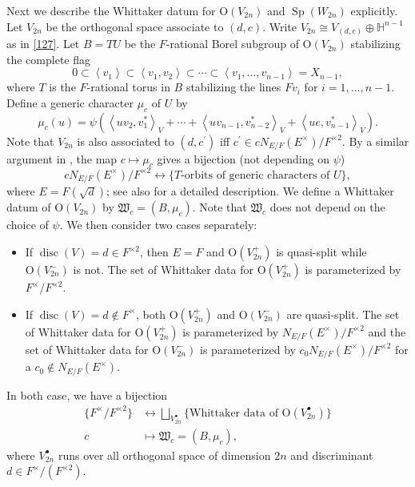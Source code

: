 \documentclass[article]{article}
\numberwithin{equation}{section}
\theoremstyle{definition}
\DeclareMathOperator{\SP}{Sp}
\DeclareMathOperator{\disc}{disc}
\begin{document}
Next we describe the Whittaker datum for $\mathrm O(V_{2n})$ and $\SP(W_{2n})$ explicitly. Let $V_{2n}$ be the orthogonal space associate to $(d,c)$. Write $V_{2n}\cong V_{(d,c)}\oplus \mathbb H^{n-1}$ as in \ref{127}. Let $B=TU$ be the $F$-rational Borel subgroup of $\mathrm O (V_{2n})$ stabilizing the complete flag
$$0 \subset\left\langle v_{1}\right\rangle \subset\left\langle v_{1}, v_{2}\right\rangle \subset \cdots \subset\left\langle v_{1}, \ldots, v_{n-1}\right\rangle= X_{n-1},$$
where $T$ is the $F$-rational torus in $B$ stabilizing the lines $F v_{i}$ for $i=1, \ldots, n-1$. Define a generic character $\mu_{c}$ of $U$ by
$$\mu_{c}(u)=\psi\left(\left\langle u v_{2}, v_{1}^{*}\right\rangle_{V}+\cdots+\left\langle u v_{n-1}, v_{n-2}^{*}\right\rangle_{V}+\left\langle u e, v_{n-1}^{*}\right\rangle_{V}\right).$$
Note that $V_{2n}$ is also associated to $(d,c^\prime)$ iff $c^\prime \in c N_{E/F}(E^{\times})/F^{\times 2}$. By a similar argument in \cite[\S 12]{MR3202556}, the map $c \mapsto \mu_{c}$ gives a bijection (not depending on $\psi$)
$$c N_{E/F}(E^{\times})/F^{\times 2} \longleftrightarrow 
\{\mbox{$T$-orbits of generic characters of $U$}\},$$
where $E=F(\sqrt{d})$; see also \cite[\S 2.2]{MR3708200} for a detailed description. We define a Whittaker datum of $\mathrm O(V_{2n})$ by $\mathfrak W_{c}=(B,\mu_c)$. Note that $\mathfrak W_{c}$ does not depend on the choice of $\psi$. We then consider two cases separately:  
\begin{itemize}
	\item If $\disc(V)=d\in F^{\times 2}$, then $E=F$ and $\mathrm O(V_{2n}^+)$ is quasi-split while $\mathrm O(V_{2n}^-)$ is not. The set of Whittaker data for $\mathrm O(V_{2n}^+)$ is parameterized by $F^\times/F^{\times 2}$.  
	\item If $\disc(V)=d\notin F^{\times}$, both $\mathrm O(V_{2n}^+)$ and $\mathrm O(V_{2n}^-)$ are quasi-split. The set of Whittaker data for $\mathrm O(V_{2n}^+)$ is parameterized by $N_{E/F}(E^\times)/F^{\times 2}$ and the set of Whittaker data for $\mathrm O(V_{2n}^-)$ is parameterized by $c_0N_{E/F}(E^\times)/F^{\times 2}$ for a $c_0\notin N_{E/F}(E^\times)$. 
\end{itemize}
In both case, we have a bijection 
\begin{align*}
\{F^{\times} /F^{\times 2}\}&\longleftrightarrow  \bigsqcup_{V_{2n}^{\bullet}} \{\mbox{Whittaker data of $\mathrm O(V_{2n}^{\bullet})$}\}\\
c &\mapsto \mathfrak W_{c}= (B,\mu_c) ,
\end{align*}
where $V_{2n}^{\bullet}$ runs over all orthogonal space of dimension $2n$ and discriminant $d\in F^\times /(F^{\times 2})$. 
\end{document}
